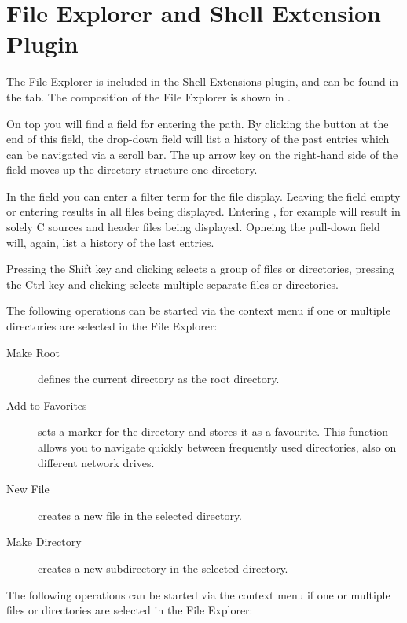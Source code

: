 \section{File Explorer and Shell Extension Plugin}\label{sec:file_explorer}

The File Explorer  is included in the Shell Extensions plugin, and can be found in the  tab. The composition of the File Explorer is shown in .

On top you will find a field for entering the path. By clicking the button at the end of this field, the drop-down field will list a history of the past entries which can be navigated via a scroll bar. The up arrow key on the right-hand side of the field moves up the directory structure one directory.

In the  field you can enter a filter term for the file display. Leaving the field empty or entering \codeline{*} results in all files being displayed. Entering , for example will result in solely C sources and header files being displayed. Opneing the pull-down field will, again, list a history of the last entries.


Pressing the Shift key and clicking selects a group of files or directories, pressing the Ctrl key and clicking selects multiple separate files or directories.

The following operations can be started via the context menu if one or multiple directories are selected in the File Explorer:

\begin{description}
\item[Make Root] defines the current directory as the root directory.
\item[Add to Favorites] sets a marker for the directory and stores it as a favourite. This function allows you to navigate quickly between frequently used directories, also on different network drives.
\item[New File] creates a new file in the selected directory.
\item[Make Directory] creates a new subdirectory in the selected directory.
\end{description}

The following operations can be started via the context menu if one or multiple files or directories are selected in the File Explorer:

